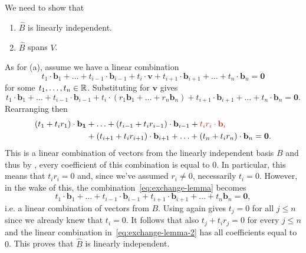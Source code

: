 \begin{lemproof}
 We need to show that
 \begin{enumerate}[label=(\alph*)]
  \item $\hat{B}$ is linearly independent.
  \item $\hat{B}$ spans $V$.
 \end{enumerate}
 As for (a), assume we have a linear combination
 \begin{equation}
  \label{eq:exchange-lemma}
  t_1 \cdot \mathbf{b}_1 + \ldots + t_{i-1} \cdot \mathbf{b}_{i-1} + t_i \cdot
  \mathbf{v} + t_{i+1} \cdot \mathbf{b}_{i+1} + \ldots + t_n \cdot \mathbf{b}_n
  = \mathbf{0}
 \end{equation}
 for some $t_1,\ldots,t_n \in \mathbb{R}$. Substituting for $\mathbf{v}$ gives
 \[
  t_1 \cdot \mathbf{b}_1 + \ldots + t_{i-1} \cdot \mathbf{b}_{i-1} + t_i \cdot
  (r_1 \mathbf{b}_1 + \ldots + r_n \mathbf{b}_n) + t_{i+1} \cdot
  \mathbf{b}_{i+1} + \ldots + t_n \cdot \mathbf{b}_n = \mathbf{0}.
 \]
 Rearranging then
 \begin{equation}
  \label{eq:exchange-lemma-2}
  \begin{split}
   (t_1 + t_i r_1) \cdot \mathbf{b_1} &+ \ldots + (t_{i-1} + t_ir_{i-1}) \cdot
   \mathbf{b}_{i-1} + \clr{t_i r_i \cdot \mathbf{b}_i}\\
   &+ (t_{i+1} + t_i r_{i+1}) \cdot \mathbf{b}_{i+1} + \ldots + (t_n + t_i r_n)
   \cdot \mathbf{b}_n = \mathbf{0}.
  \end{split}
 \end{equation}
 This is a linear combination of vectors from the linearly independent basis $B$
 and thus by , every
 coefficient of this combination is equal to $0$. In particular, this means that
 $t_i r_i = 0$ and, since we've assumed $r_i \neq 0$, necessarily $t_i = 0$.
 However, in the wake of this, the combination~\eqref{eq:exchange-lemma} becomes
 \[
  t_1 \cdot \mathbf{b}_1 + \ldots + t_{i-1} \cdot \mathbf{b}_{i-1} + t_{i+1}
  \cdot \mathbf{b}_{i+1} + \ldots + t_n \mathbf{b}_n = \mathbf{0},
 \]
 i.e. a linear combination of vectors from $B$. Using
  again gives $t_j = 0$
 for all $j \leq n$ since we already knew that $t_i = 0$. It follows that also
 $t_j + t_i r_j = 0$ for every $j \leq n$ and the linear combination
 in~\eqref{eq:exchange-lemma-2} has all coefficients equal to $0$. This proves
 that $\hat{B}$ is linearly independent.


\end{lemproof}
